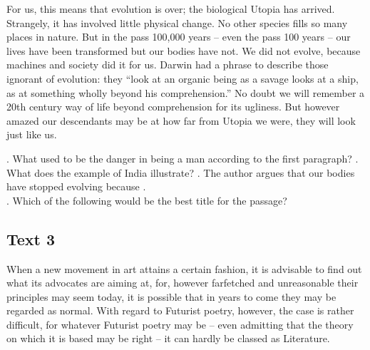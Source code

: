 For us, this means that evolution is over; the biological Utopia has arrived. Strangely, it has involved little physical change. No other species fills so many places in nature. But in the pass 100,000 years -- even the pass 100 years -- our lives have been transformed but our bodies have not. We did not evolve, because machines and society did it for us. Darwin had a phrase to describe those ignorant of evolution: they “look at an organic being as a savage looks at a ship, as at something wholly beyond his comprehension.” No doubt we will remember a 20th century way of life beyond comprehension for its ugliness. But however amazed our descendants may be at how far from Utopia we were, they will look just like us.
\begin{questions}  .	What used to be the danger in being a man according to the first paragraph?
 .	What does the example of India illustrate?
 .	The author argues that our bodies have stopped evolving because \ltk{}.\\
 .	Which of the following would be the best title for the passage?
\end{questions}    
\subsection{Text 3}
When a new movement in art attains a certain fashion, it is advisable to find out what its advocates are aiming at, for, however farfetched and unreasonable their principles may seem today, it is possible that in years to come they may be regarded as normal. With regard to Futurist poetry, however, the case is rather difficult, for whatever Futurist poetry may be -- even admitting that the theory on which it is based may be right -- it can hardly be classed as Literature.

